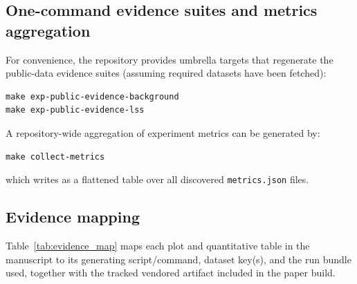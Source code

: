 \documentclass[11pt]{article}
\theoremstyle{definition}
\theoremstyle{plain}
\theoremstyle{remark}
\begin{document}
\subsection{One-command evidence suites and metrics aggregation}\label{app:repro:onecommand}
For convenience, the repository provides umbrella targets that regenerate the public-data evidence suites (assuming required datasets have been fetched):
\begin{verbatim}
make exp-public-evidence-background
make exp-public-evidence-lss
\end{verbatim}
A repository-wide aggregation of experiment metrics can be generated by:
\begin{verbatim}
make collect-metrics
\end{verbatim}
which writes \texttt{} as a flattened table over all discovered \texttt{metrics.json} files.

\subsection{Evidence mapping}\label{app:repro:map}
Table~\ref{tab:evidence_map} maps each plot and quantitative table in the manuscript to its generating script/command, dataset key(s), and the run bundle used, together with the tracked vendored artifact included in the paper build.


\end{document}
